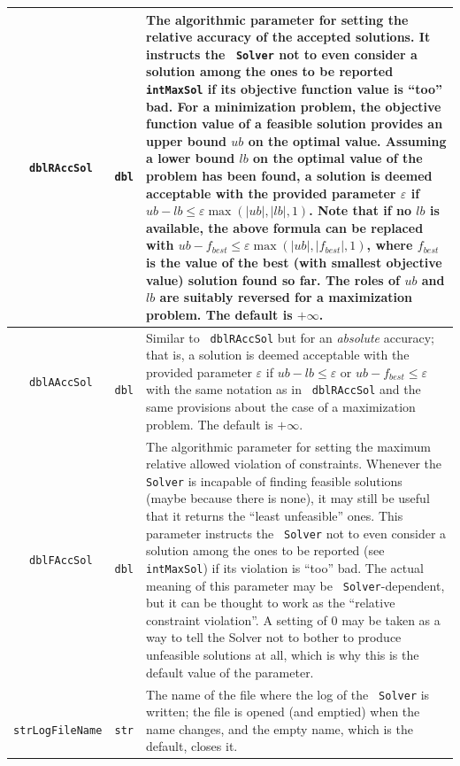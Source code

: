 \documentclass[a4paper]{article}
\newcommand{\code}[1]{\textrm{\texttt{\hyphenchar\font=200 #1}}}
\def\Solver{\code{Solver}\xspace}
\begin{document}
\begin{longtable}{|c|c|p{13cm}|}
 \code{dblRAccSol} & \code{dbl} & The algorithmic parameter for setting the relative accuracy of the accepted solutions. It instructs the \Solver not to even consider a solution among the ones to be reported \code{intMaxSol} if its objective function value is ``too'' bad. For a minimization problem, the objective function value of a feasible solution provides an upper bound $ub$ on the optimal value. Assuming a lower bound $lb$ on the optimal value of the problem has been found, a solution is deemed acceptable with the provided parameter $\varepsilon$ if $ub - lb \leq \varepsilon \max( |ub| , |lb| , 1 )$. Note that if no $lb$ is available, the above formula can be replaced with $ub - f_{best} \leq \varepsilon \max( |ub| , |f_{best}| , 1 )$, where $f_{best}$ is the value of the best (with smallest objective value) solution found so far. The roles of $ub$ and $lb$ are suitably reversed for a maximization problem. The default is $+\infty$.\\
 \hline
 \code{dblAAccSol} & \code{dbl} & Similar to \code{dblRAccSol} but for an \emph{absolute} accuracy; that is, a solution is deemed acceptable with the provided parameter $\varepsilon$ if $ub - lb \leq \varepsilon$ or $ub - f_{best} \leq \varepsilon$ with the same notation as in \code{dblRAccSol} and the same provisions about the case of a maximization problem. The default is $+\infty$.\\
 \hline
 \code{dblFAccSol} & \code{dbl} & The algorithmic parameter for setting the maximum relative allowed violation of constraints. Whenever the \Solver is incapable of finding feasible solutions (maybe because there is none), it may still be useful that it returns the ``least unfeasible'' ones. This parameter instructs the \Solver not to even consider a solution among the ones to be reported (see \code{intMaxSol}) if its violation is ``too'' bad. The actual meaning of this parameter may be \Solver-dependent, but it can be thought to work as the ``relative constraint violation''. A setting of $0$ may be taken as a way to tell the Solver not to bother to produce unfeasible solutions at all, which is why this is the default value of the parameter.\\
 \hline
 \code{strLogFileName} & \code{str} & The name of the file where the log of the \Solver is written; the file is opened (and emptied) when the name changes, and the empty name, which is the default, closes it.\\
  \hline
\end{longtable}
\end{document}
